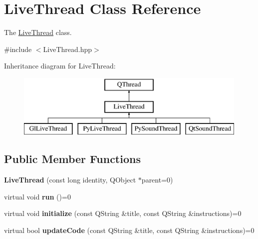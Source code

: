 \hypertarget{classLiveThread}{\section{Live\+Thread Class Reference}
\label{classLiveThread}
}


The \hyperlink{classLiveThread}{Live\+Thread} class.  




{\ttfamily \#include $<$Live\+Thread.\+hpp$>$}

Inheritance diagram for Live\+Thread\+:\begin{figure}[H]
\begin{center}
\leavevmode
\includegraphics[height=3.000000cm]{classLiveThread}
\end{center}
\end{figure}
\subsection*{Public Member Functions}
\begin{DoxyCompactItemize}
\item 
\hypertarget{classLiveThread_ae6d3dbf7a848c4c45c6792f7b6dd0ba1}{{\bfseries Live\+Thread} (const long identity, Q\+Object $\ast$parent=0)}\label{classLiveThread_ae6d3dbf7a848c4c45c6792f7b6dd0ba1}

\item 
\hypertarget{classLiveThread_ac3fa286fc1a4cd6482f66b490301431d}{virtual void {\bfseries run} ()=0}\label{classLiveThread_ac3fa286fc1a4cd6482f66b490301431d}

\item 
\hypertarget{classLiveThread_a7057545ae0d705fa19368d8c8e064bc8}{virtual void {\bfseries initialize} (const Q\+String \&title, const Q\+String \&instructions)=0}\label{classLiveThread_a7057545ae0d705fa19368d8c8e064bc8}

\item 
\hypertarget{classLiveThread_a03674124c426aa2f40a0e704100a5ae6}{virtual bool {\bfseries update\+Code} (const Q\+String \&title, const Q\+String \&instructions)=0}\label{classLiveThread_a03674124c426aa2f40a0e704100a5ae6}

\end{DoxyCompactItemize}
